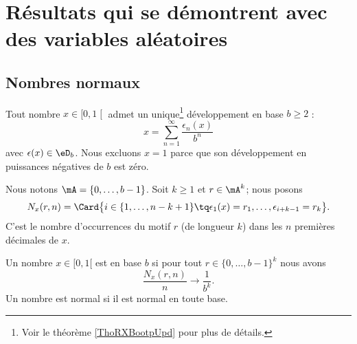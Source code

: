 
\section{Résultats qui se démontrent avec des variables aléatoires}

\subsection{Nombres normaux}

Tout nombre \( x\in \mathopen[ 0 , 1 \mathclose[\) admet un unique\footnote{Voir le théorème \ref{ThoRXBootpUpd} pour plus de détails.}
développement en base \( b\geq 2\) :
\begin{equation}
	x=\sum_{n=1}^{\infty}\frac{ \epsilon_n(x) }{ b^n }
\end{equation}
avec \( \epsilon(x)\in \eD_b\). Nous excluons \( x=1\) parce que son développement en puissances négatives de \( b\) est zéro.

Nous notons \( \mA=\{ 0,\ldots, b-1 \}\). Soit \( k\geq 1\) et \( r\in \mA^k\); nous posons
\begin{equation}
	N_x(r,n)=\Card\big\{   i\in\{ 1,\ldots, n-k+1 \}\tq \epsilon_1(x)=r_1,\ldots, \epsilon_{i+k-1}=r_k \big\}.
\end{equation}
C'est le nombre d'occurrences du motif \( r\) (de longueur \( k\)) dans les \( n\) premières décimales de \( x\).

\begin{definition}
	Un nombre \( x\in\mathopen[ 0 , 1 [\) est  en base \( b\) si pour tout \( r\in\{ 0,\ldots, b-1 \}^k\) nous avons
	\begin{equation}
		\frac{ N_x(r,n) }{ n }\to \frac{1}{ b^k }.
	\end{equation}
	Un nombre est normal si il est normal en toute base.
\end{definition}

